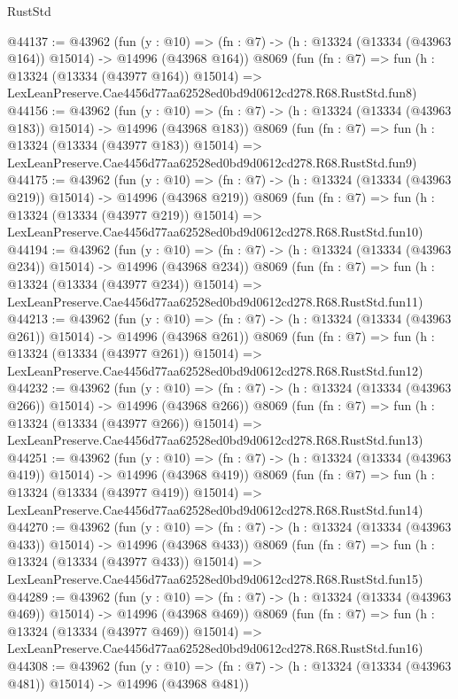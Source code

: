 \begin{lexlean}{RustStd}
\begin{coremodule}
@44137 := @43962
    (fun (y : @10) =>
    (fn : @7) -> (h : @13324 (@13334 (@43963 @164)) @15014) -> @14996 (@43968 @164))
    @8069
    (fun (fn : @7) =>
    fun (h : @13324 (@13334 (@43977 @164)) @15014) =>
    LexLeanPreserve.Cae4456d77aa62528ed0bd9d0612cd278.R68.RustStd.fun8)
@44156 := @43962
    (fun (y : @10) =>
    (fn : @7) -> (h : @13324 (@13334 (@43963 @183)) @15014) -> @14996 (@43968 @183))
    @8069
    (fun (fn : @7) =>
    fun (h : @13324 (@13334 (@43977 @183)) @15014) =>
    LexLeanPreserve.Cae4456d77aa62528ed0bd9d0612cd278.R68.RustStd.fun9)
@44175 := @43962
    (fun (y : @10) =>
    (fn : @7) -> (h : @13324 (@13334 (@43963 @219)) @15014) -> @14996 (@43968 @219))
    @8069
    (fun (fn : @7) =>
    fun (h : @13324 (@13334 (@43977 @219)) @15014) =>
    LexLeanPreserve.Cae4456d77aa62528ed0bd9d0612cd278.R68.RustStd.fun10)
@44194 := @43962
    (fun (y : @10) =>
    (fn : @7) -> (h : @13324 (@13334 (@43963 @234)) @15014) -> @14996 (@43968 @234))
    @8069
    (fun (fn : @7) =>
    fun (h : @13324 (@13334 (@43977 @234)) @15014) =>
    LexLeanPreserve.Cae4456d77aa62528ed0bd9d0612cd278.R68.RustStd.fun11)
@44213 := @43962
    (fun (y : @10) =>
    (fn : @7) -> (h : @13324 (@13334 (@43963 @261)) @15014) -> @14996 (@43968 @261))
    @8069
    (fun (fn : @7) =>
    fun (h : @13324 (@13334 (@43977 @261)) @15014) =>
    LexLeanPreserve.Cae4456d77aa62528ed0bd9d0612cd278.R68.RustStd.fun12)
@44232 := @43962
    (fun (y : @10) =>
    (fn : @7) -> (h : @13324 (@13334 (@43963 @266)) @15014) -> @14996 (@43968 @266))
    @8069
    (fun (fn : @7) =>
    fun (h : @13324 (@13334 (@43977 @266)) @15014) =>
    LexLeanPreserve.Cae4456d77aa62528ed0bd9d0612cd278.R68.RustStd.fun13)
@44251 := @43962
    (fun (y : @10) =>
    (fn : @7) -> (h : @13324 (@13334 (@43963 @419)) @15014) -> @14996 (@43968 @419))
    @8069
    (fun (fn : @7) =>
    fun (h : @13324 (@13334 (@43977 @419)) @15014) =>
    LexLeanPreserve.Cae4456d77aa62528ed0bd9d0612cd278.R68.RustStd.fun14)
@44270 := @43962
    (fun (y : @10) =>
    (fn : @7) -> (h : @13324 (@13334 (@43963 @433)) @15014) -> @14996 (@43968 @433))
    @8069
    (fun (fn : @7) =>
    fun (h : @13324 (@13334 (@43977 @433)) @15014) =>
    LexLeanPreserve.Cae4456d77aa62528ed0bd9d0612cd278.R68.RustStd.fun15)
@44289 := @43962
    (fun (y : @10) =>
    (fn : @7) -> (h : @13324 (@13334 (@43963 @469)) @15014) -> @14996 (@43968 @469))
    @8069
    (fun (fn : @7) =>
    fun (h : @13324 (@13334 (@43977 @469)) @15014) =>
    LexLeanPreserve.Cae4456d77aa62528ed0bd9d0612cd278.R68.RustStd.fun16)
@44308 := @43962
    (fun (y : @10) =>
    (fn : @7) -> (h : @13324 (@13334 (@43963 @481)) @15014) -> @14996 (@43968 @481))

\end{coremodule}
\end{lexlean}
